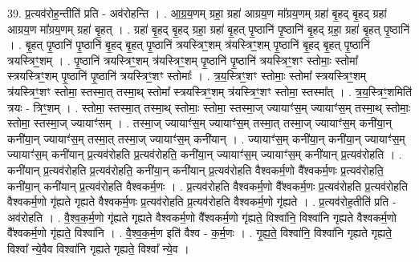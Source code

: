 \documentclass[17pt]{extarticle}
\begin{document}
39. प्र॒त्यव॑रोह॒न्तीति॑ प्रति - अव॑रोहन्ति । . आ॒ग्र॒य॒णम् ग्रहा॒ ग्रहा॑ आग्रय॒ण मा᳚ग्रय॒णम् ग्रहा॑ बृ॒हद् बृ॒हद् ग्रहा॑ आग्रय॒ण मा᳚ग्रय॒णम् ग्रहा॑ बृ॒हत् । . ग्रहा॑ बृ॒हद् बृ॒हद् ग्रहा॒ ग्रहा॑ बृ॒हत् पृ॒ष्ठानि॑ पृ॒ष्ठानि॑ बृ॒हद् ग्रहा॒ ग्रहा॑ बृ॒हत् पृ॒ष्ठानि॑ । . बृ॒हत् पृ॒ष्ठानि॑ पृ॒ष्ठानि॑ बृ॒हद् बृ॒हत् पृ॒ष्ठानि॑ त्रयस्त्रिꣳ॒॒शम् त्र॑यस्त्रिꣳ॒॒शम् पृ॒ष्ठानि॑ बृ॒हद् बृ॒हत् पृ॒ष्ठानि॑ त्रयस्त्रिꣳ॒॒शम् । . पृ॒ष्ठानि॑ त्रयस्त्रिꣳ॒॒शम् त्र॑यस्त्रिꣳ॒॒शम् पृ॒ष्ठानि॑ पृ॒ष्ठानि॑ त्रयस्त्रिꣳ॒॒शꣳ स्तोमाः॒ स्तोमा᳚ स्त्रयस्त्रिꣳ॒॒शम् पृ॒ष्ठानि॑ पृ॒ष्ठानि॑ त्रयस्त्रिꣳ॒॒शꣳ स्तोमाः᳚ । . त्र॒य॒स्त्रिꣳ॒॒शꣳ स्तोमाः॒ स्तोमा᳚ स्त्रयस्त्रिꣳ॒॒शम् त्र॑यस्त्रिꣳ॒॒शꣳ स्तोमा॒ स्तस्मा॒त् तस्मा॒थ् स्तोमा᳚ स्त्रयस्त्रिꣳ॒॒शम् त्र॑यस्त्रिꣳ॒॒शꣳ स्तोमा॒ स्तस्मा᳚त् । . त्र॒य॒स्त्रिꣳ॒॒शमिति॑ त्रयः - त्रिꣳ॒॒शम् । . स्तोमा॒ स्तस्मा॒त् तस्मा॒थ् स्तोमाः॒ स्तोमा॒ स्तस्मा॒ज् ज्यायाꣳ॑स॒म् ज्यायाꣳ॑स॒म् तस्मा॒थ् स्तोमाः॒ स्तोमा॒ स्तस्मा॒ज् ज्यायाꣳ॑सम् । . तस्मा॒ज् ज्यायाꣳ॑स॒म् ज्यायाꣳ॑स॒म् तस्मा॒त् तस्मा॒ज् ज्यायाꣳ॑स॒म् कनी॑या॒न् कनी॑या॒न् ज्यायाꣳ॑स॒म् तस्मा॒त् तस्मा॒ज् ज्यायाꣳ॑स॒म् कनी॑यान् । . ज्यायाꣳ॑स॒म् कनी॑या॒न् कनी॑या॒न् ज्यायाꣳ॑स॒म् ज्यायाꣳ॑स॒म् कनी॑यान् प्र॒त्यव॑रोहति प्र॒त्यव॑रोहति॒ कनी॑या॒न् ज्यायाꣳ॑स॒म् ज्यायाꣳ॑स॒म् कनी॑यान् प्र॒त्यव॑रोहति । . कनी॑यान् प्र॒त्यव॑रोहति प्र॒त्यव॑रोहति॒ कनी॑या॒न् कनी॑यान् प्र॒त्यव॑रोहति वैश्वकर्म॒णो वै᳚श्वकर्म॒णः प्र॒त्यव॑रोहति॒ कनी॑या॒न् कनी॑यान् प्र॒त्यव॑रोहति वैश्वकर्म॒णः । . प्र॒त्यव॑रोहति वैश्वकर्म॒णो वै᳚श्वकर्म॒णः प्र॒त्यव॑रोहति प्र॒त्यव॑रोहति वैश्वकर्म॒णो गृ॑ह्यते गृह्यते वैश्वकर्म॒णः प्र॒त्यव॑रोहति प्र॒त्यव॑रोहति वैश्वकर्म॒णो गृ॑ह्यते । . प्र॒त्यव॑रोह॒तीति॑ प्रति - अव॑रोहति । . वै॒श्व॒क॒र्म॒णो गृ॑ह्यते गृह्यते वैश्वकर्म॒णो वै᳚श्वकर्म॒णो गृ॑ह्यते॒ विश्वा॑नि॒ विश्वा॑नि गृह्यते वैश्वकर्म॒णो वै᳚श्वकर्म॒णो गृ॑ह्यते॒ विश्वा॑नि । . वै॒श्व॒क॒र्म॒ण इति॑ वैश्व - क॒र्म॒णः । . गृ॒ह्य॒ते॒ विश्वा॑नि॒ विश्वा॑नि गृह्यते गृह्यते॒ विश्वा᳚ न्ये॒वैव विश्वा॑नि गृह्यते गृह्यते॒ विश्वा᳚ न्ये॒व । \newline
\end{document}

